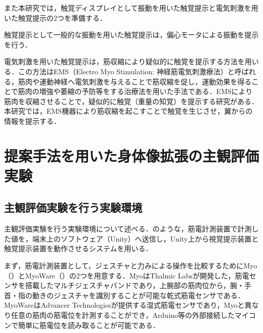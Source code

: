 \begin{small}
      また本研究では，触覚ディスプレイとして振動を用いた触覚提示と電気刺激を用いた触覚提示の2つを準備する．
      
      触覚提示として一般的な振動を用いた触覚提示は，偏心モータによる振動を提示を行う．
  
      電気刺激を用いた触覚提示は，筋収縮により疑似的に触覚を提示する方法を用いる．この方法はEMS（Electro Myo Stimulation: 神経筋電気刺激療法）と呼ばれる，筋肉や運動神経へ電気刺激を与えることで筋収縮を促し，運動効果を得ることで筋肉の増強や萎縮の予防等をする治療法を用いた手法である．EMSにより筋肉を収縮させることで，疑似的に触覚（重量の知覚）を提示する研究がある\cite{小川剛史2017電気的筋肉刺激が重量知覚に及ぼす影響の分析}．本研究では，EMS機器により筋収縮を起こすことで触覚を生じさせ，翼からの情報を提示する．


\section{提案手法を用いた身体像拡張の主観評価実験}

  \subsection{主観評価実験を行う実験環境}
    
    主観評価実験を行う実験環境について述べる．のような，筋電計測装置で計測した値を，端末上のソフトウェア（Unity）へ送信し，Unity上から視覚提示装置と触覚提示装置を動作させるシステムを用いる．



    まず，筋電計測装置として，ジェスチャと力みによる操作を比較するためにMyo（）\cite{thalmiclabs}とMyoWare（）\cite{advancertechnologies}の2つを用意する．MyoはThalmic Labsが開発した，筋電センサを搭載したマルチジェスチャバンドであり，上腕部の筋肉位から，腕・手首・指の動きのジェスチャを識別することが可能な乾式筋電センサである．MyoWareはAdvancer Technologiesが提供する湿式筋電センサであり，Myoと異なり任意の筋肉の筋電位を計測することができ，Arduino等の外部接続したマイコンで簡単に筋電位を読み取ることが可能である．


\end{small}

